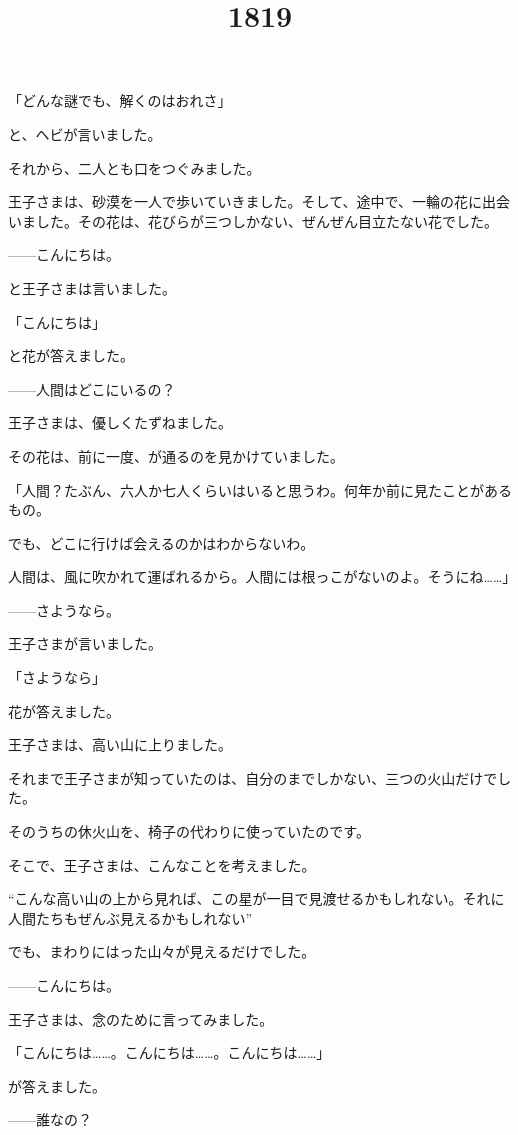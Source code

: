 「どんな謎でも、解くのはおれさ」

と、ヘビが言いました。

それから、二人とも口をつぐみました。

\title{18}

王子さまは、砂漠を一人で歩いていきました。そして、途中で、一輪の花に出会いました。その花は、花びらが三つしかない、ぜんぜん目立たない花でした。

——こんにちは。

と王子さまは言いました。

「こんにちは」

と花が答えました。

——人間はどこにいるの？

王子さまは、優しくたずねました。

その花は、前に一度、が通るのを見かけていました。

「人間？たぶん、六人か七人くらいはいると思うわ。何年か前に見たことがあるもの。

でも、どこに行けば会えるのかはわからないわ。

人間は、風に吹かれて運ばれるから。人間には根っこがないのよ。そうにね……」

——さようなら。

王子さまが言いました。

「さようなら」

花が答えました。


\title{19}

王子さまは、高い山に上りました。

それまで王子さまが知っていたのは、自分のまでしかない、三つの火山だけでした。

そのうちの休火山を、椅子の代わりに使っていたのです。

そこで、王子さまは、こんなことを考えました。

“こんな高い山の上から見れば、この星が一目で見渡せるかもしれない。それに人間たちもぜんぶ見えるかもしれない”

でも、まわりにはった山々が見えるだけでした。

——こんにちは。

王子さまは、念のために言ってみました。

「こんにちは……。こんにちは……。こんにちは……」

が答えました。

——誰なの？

